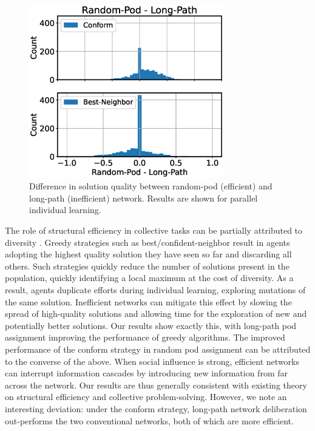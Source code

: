 \begin{figure}
    \label{fig:results-netdelib-efficiency}
    \centering
    \includegraphics[width=3.33in]{fig/NetDelibABM/fig-results-netdelib-efficiency.eps}
\caption{Difference in solution quality between random-pod (efficient) and long-path (inefficient) network. Results are shown for parallel individual learning.}
\end{figure}

The role of structural efficiency in collective tasks can be partially attributed to diversity \cite{lazer_network_2007, hong_groups_2004}. Greedy strategies such as best/confident-neighbor result in agents adopting the highest quality solution they have seen so far and discarding all others. Such strategies quickly reduce the number of solutions present in the population, quickly identifying a local maximum at the cost of diversity. As a result, agents duplicate efforts during individual learning, exploring mutations of the same solution. Inefficient networks can mitigate this effect by slowing the spread of high-quality solutions and allowing time for the exploration of new and potentially better solutions. Our results show exactly this, with long-path pod assignment improving the performance of greedy algorithms. The improved performance of the conform strategy in random pod assignment can be attributed to the converse of the above. When social influence is strong, efficient networks can interrupt information cascades by introducing new information from far across the network.
Our results are thus generally consistent with existing theory on structural efficiency and collective problem-solving.
However, we note an interesting deviation: under the conform strategy, long-path network deliberation out-performs the two conventional networks, both of which are more efficient.

